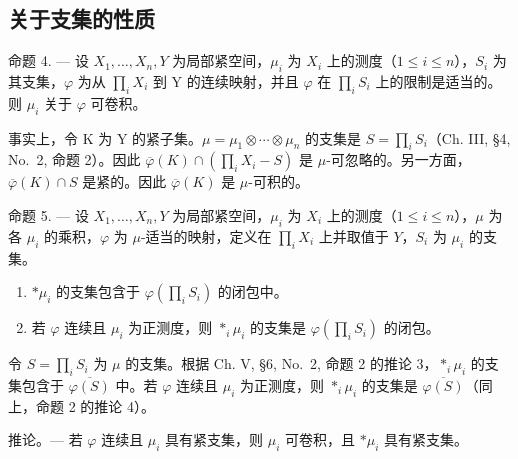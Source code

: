 \subsection{关于支集的性质}

命题 4. --- 设 \(X_{1},\ldots,X_{n},Y\) 为局部紧空间，\(\mu_{i}\) 为 \(X_{i}\) 上的测度（\(1\leqslant i\leqslant n\)），\(S_{i}\) 为其支集，\(\varphi\) 为从 \(\prod_{i} X_{i}\) 到 Y 的连续映射，并且 \(\varphi\) 在 \(\prod_{i} S_{i}\) 上的限制是适当的。则 \(\mu_{i}\) 关于 \(\varphi\) 可卷积。

事实上，令 K 为 Y 的紧子集。\(\mu = \mu_{1} \otimes \cdots \otimes \mu_{n}\) 的支集是 \(S = \prod_{i} S_{i}\)（Ch. III, §4, No.~2, 命题 2）。因此 \(\overline{\varphi}(K) \cap \left( \prod_{i} X_{i} - S \right)\) 是 \(\mu\)-可忽略的。另一方面，\(\overline{\varphi}(K) \cap S\) 是紧的。因此 \(\overline{\varphi}(K)\) 是 \(\mu\)-可积的。

命题 5. --- 设 \(X_1, \ldots, X_n, Y\) 为局部紧空间，\(\mu_i\) 为 \(X_i\) 上的测度（\(1 \leqslant i \leqslant n\)），\(\mu\) 为各 \(\mu_i\) 的乘积，\(\varphi\) 为 \(\mu\)-适当的映射，定义在 \(\prod_i X_i\) 上并取值于 \(Y\)，\(S_i\) 为 \(\mu_i\) 的支集。

\begin{enumerate}
\def\labelenumi{\alph{enumi})}
\item
  \(*\mu_i\) 的支集包含于 \(\varphi\left(\prod_{i}S_i\right)\) 的闭包中。
\item
  若 \(\varphi\) 连续且 \(\mu_{i}\) 为正测度，则 \(*_{i} \mu_{i}\) 的支集是 \(\varphi\left(\prod_{i} S_{i}\right)\) 的闭包。
\end{enumerate}

令 \(S = \prod_{i} S_{i}\) 为 \(\mu\) 的支集。根据 Ch. V, §6, No.~2, 命题 2 的推论 3，\(*_{i} \mu_{i}\) 的支集包含于 \(\overline{\varphi(S)}\) 中。若 \(\varphi\) 连续且 \(\mu_{i}\) 为正测度，则 \(*_{i} \mu_{i}\) 的支集是 \(\overline{\varphi(S)}\)（同上，命题 2 的推论 4）。

推论。--- 若 \(\varphi\) 连续且 \(\mu_{i}\) 具有紧支集，则 \(\mu_{i}\) 可卷积，且 \(*\mu_{i}\) 具有紧支集。

